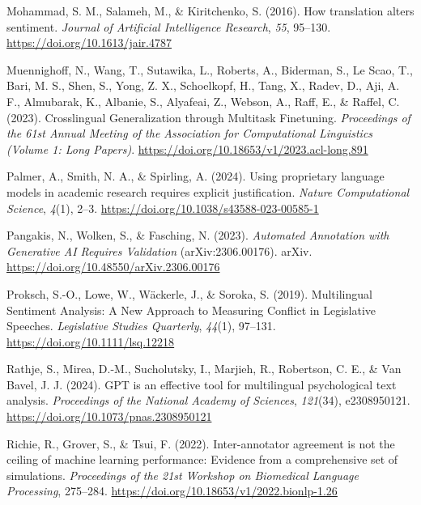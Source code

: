 \documentclass[
  man,
  floatsintext,
  longtable,
  nolmodern,
  notxfonts,
  notimes,
  colorlinks=true,linkcolor=blue,citecolor=blue,urlcolor=blue]{apa7}
\newlength{\cslhangindent}
\newenvironment{CSLReferences}[2] %
 {\begin{list}{}{%
  \setlength{\itemindent}{0pt}
  \setlength{\leftmargin}{0pt}
  \setlength{\parsep}{0pt}
  \ifodd #1
   \setlength{\leftmargin}{\cslhangindent}
   \setlength{\itemindent}{-1\cslhangindent}
  \fi
  \setlength{\itemsep}{#2\baselineskip}}}
 {\end{list}}
\begin{document}
\begin{CSLReferences}{1}{0}
Mohammad, S. M., Salameh, M., \& Kiritchenko, S. (2016). How translation
alters sentiment. \emph{Journal of Artificial Intelligence Research},
\emph{55}, 95--130. \url{https://doi.org/10.1613/jair.4787}

Muennighoff, N., Wang, T., Sutawika, L., Roberts, A., Biderman, S., Le
Scao, T., Bari, M. S., Shen, S., Yong, Z. X., Schoelkopf, H., Tang, X.,
Radev, D., Aji, A. F., Almubarak, K., Albanie, S., Alyafeai, Z., Webson,
A., Raff, E., \& Raffel, C. (2023). Crosslingual {Generalization}
through {Multitask Finetuning}. \emph{Proceedings of the 61st {Annual
Meeting} of the {Association} for {Computational Linguistics} ({Volume}
1: {Long Papers})}. \url{https://doi.org/10.18653/v1/2023.acl-long.891}

Palmer, A., Smith, N. A., \& Spirling, A. (2024). Using proprietary
language models in academic research requires explicit justification.
\emph{Nature Computational Science}, \emph{4}(1), 2--3.
\url{https://doi.org/10.1038/s43588-023-00585-1}

Pangakis, N., Wolken, S., \& Fasching, N. (2023). \emph{Automated
{Annotation} with {Generative AI Requires Validation}}
(arXiv:2306.00176). arXiv.
\url{https://doi.org/10.48550/arXiv.2306.00176}

Proksch, S.-O., Lowe, W., Wäckerle, J., \& Soroka, S. (2019).
Multilingual {Sentiment Analysis}: {A New Approach} to {Measuring
Conflict} in {Legislative Speeches}. \emph{Legislative Studies
Quarterly}, \emph{44}(1), 97--131.
\url{https://doi.org/10.1111/lsq.12218}

Rathje, S., Mirea, D.-M., Sucholutsky, I., Marjieh, R., Robertson, C.
E., \& Van Bavel, J. J. (2024). {GPT} is an effective tool for
multilingual psychological text analysis. \emph{Proceedings of the
National Academy of Sciences}, \emph{121}(34), e2308950121.
\url{https://doi.org/10.1073/pnas.2308950121}

Richie, R., Grover, S., \& Tsui, F. (2022). Inter-annotator agreement is
not the ceiling of machine learning performance: {Evidence} from a
comprehensive set of simulations. \emph{Proceedings of the 21st
{Workshop} on {Biomedical Language Processing}}, 275--284.
\url{https://doi.org/10.18653/v1/2022.bionlp-1.26}


\end{CSLReferences}
\end{document}
